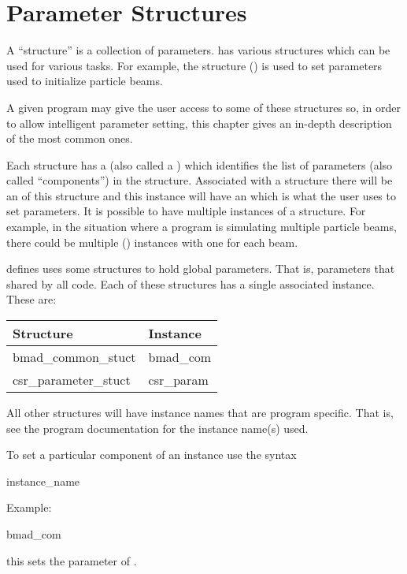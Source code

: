\chapter{Parameter Structures}
\label{c:param.structs}

A ``structure'' is a collection of parameters.  \bmad has various
structures which can be used for various tasks. For example, the
 structure () is used to set
parameters used to initialize particle beams.

A given program may give the user access to some of these structures
so, in order to allow intelligent parameter setting, this chapter
gives an in-depth description of the most common ones.

Each structure has a  (also called a ) which identifies the list of parameters (also called
``components'') in the structure. Associated with a structure there
will be an  of this structure and this instance will
have an  which is what the user uses to set
parameters. It is possible to have multiple instances of a
structure. For example, in the situation where a program is simulating
multiple particle beams, there could be multiple 
() instances with one for each beam.

\bmad defines uses some structures to hold global parameters. That is,
parameters that shared by all code. Each of these structures has
a single associated instance. These are:
\begin{center}
  \begin{tabular}{ll} \toprule
  Structure           & Instance    \\
  \midrule
  bmad_common_stuct   & bmad_com    \\
  csr_parameter_stuct & csr_param   \\
  \bottomrule
  \end{tabular}
\end{center}
All other structures will have instance names that are program
specific.  That is, see the program documentation for the instance
name(s) used.

To set a particular component of an instance use the syntax
\begin{example}
  instance_name%
\end{example}
Example:
\begin{example}
  bmad_com%
\end{example}
this sets the  parameter of .

